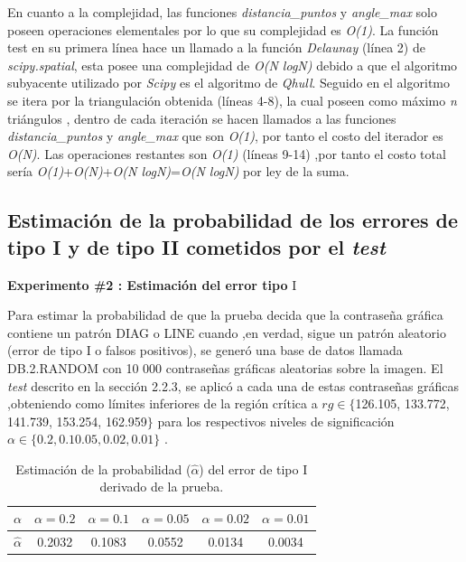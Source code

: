 \documentclass[12pt]{report}
\begin{document}
En cuanto a la complejidad, las funciones \textit{distancia\_puntos} y \textit{angle\_max} solo poseen operaciones elementales por lo que su complejidad es \textit{O(1)}. La función test en su primera línea hace un llamado a la función  \textit{Delaunay} (línea 2) de \textit{scipy.spatial}, esta posee una complejidad de \textit{O(N logN)} debido a que el algoritmo subyacente utilizado por \textit{Scipy} es el algoritmo de \textit{Qhull}. Seguido en el algoritmo se itera por la triangulación obtenida (líneas 4-8), la cual poseen como máximo \textit{n} triángulos , dentro de cada iteración se hacen llamados a las  funciones \textit{distancia\_puntos} y \textit{angle\_max}  que son \textit{O(1)}, por tanto el costo del iterador es \textit{O(N)}. Las operaciones restantes son \textit{O(1)} (líneas 9-14) ,por tanto el costo total sería \textit{O(1)}+\textit{O(N)}+\textit{O(N logN)}=\textit{O(N logN)} por ley de la suma.

\subsection{Estimación de la probabilidad de los errores de tipo I y de tipo II  cometidos por el \textit{test}}	 
\textbf{Experimento \#2 : Estimación del error tipo} I

Para estimar la probabilidad de que la prueba decida que la contraseña gráfica contiene un patrón DIAG o LINE cuando ,en verdad, sigue un patrón aleatorio (error de tipo I o falsos positivos), se generó una base de datos llamada DB.2.RANDOM con 10 000 contraseñas gráficas aleatorias sobre la imagen. El \textit{test} descrito en la sección 2.2.3, se aplicó a cada una de estas contraseñas gráficas ,obteniendo como límites inferiores de la región crítica a  $rg \in \{$126.105, 133.772, 141.739, 153.254, 162.959$\}$ para los respectivos  niveles de significación $\alpha \in \{0.2, 0.1 0.05, 0.02 , 0.01\}$ .

\begin{table}[h!]
	\centering
	\begin{tabular}{|c|ccccc|}
		\hline
		$\alpha$ & $\alpha = 0.2$ & $\alpha = 0.1$ & $\alpha = 0.05$ & $\alpha = 0.02$ & $\alpha = 0.01$ \\
		\hline
		$\hat{\alpha}$ & 0.2032 & 0.1083 & 0.0552 & 0.0134 & 0.0034 \\
		\hline
	\end{tabular}
	\caption{Estimación de la probabilidad ($\hat{\alpha}$) del error de tipo I derivado de la prueba.}
	\label{tab:error1-prob1}
\end{table}
\end{document}

